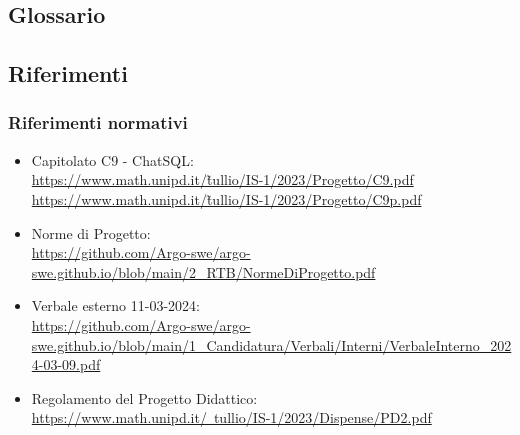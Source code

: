 \subsection{Glossario}
\GlossarioIntroduzione

\subsection{Riferimenti}
\subsubsection{Riferimenti normativi}
\begin{itemize}
  \item Capitolato C9 - ChatSQL:\\ \href{https://www.math.unipd.it/~tullio/IS-1/2023/Progetto/C9.pdf}{https://www.math.unipd.it/\~tullio/IS-1/2023/Progetto/C9.pdf} \\ \href{https://www.math.unipd.it/~tullio/IS-1/2023/Progetto/C9.pdf}{https://www.math.unipd.it/\~tullio/IS-1/2023/Progetto/C9p.pdf}
  \item Norme di Progetto:\\ \href{https://github.com/Argo-swe/argo-swe.github.io/blob/main/2_RTB/NormeDiProgetto.pdf}{https://github.com/Argo-swe/argo-swe.github.io/blob/main/2\_RTB/NormeDiProgetto.pdf}
  \item Verbale esterno 11-03-2024:\\ \href{https://github.com/Argo-swe/argo-swe.github.io/blob/main/1_Candidatura/Verbali/Interni/VerbaleInterno_2024-03-09.pdf}{https://github.com/Argo-swe/argo-swe.github.io/blob/main/1\_Candidatura/Verbali/Interni/VerbaleInterno\_2024-03-09.pdf}
  \item Regolamento del Progetto Didattico:\\ \href{https://www.math.unipd.it/~tullio/IS-1/2023/Dispense/PD2.pdf}{https://www.math.unipd.it/~tullio/IS-1/2023/Dispense/PD2.pdf}
\end{itemize}

